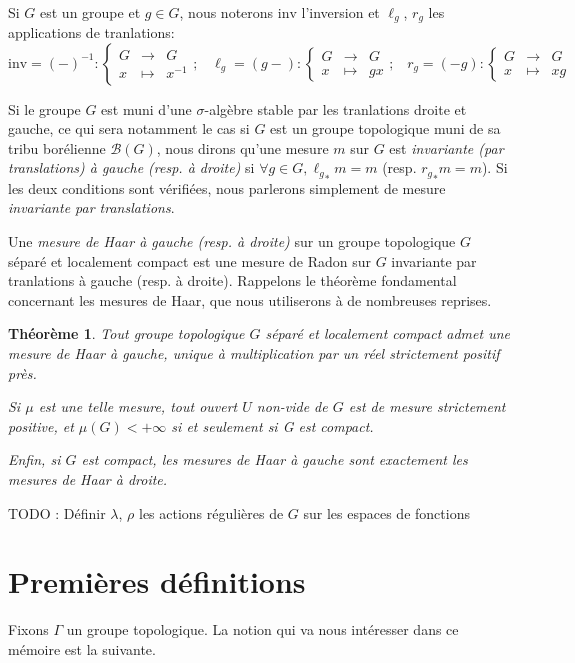 \documentclass[a4paper,12pt]{article}
\newtheorem{theorem}{Théorème}[section]
\newcommand{\Bor}{\mathcal{B}}
\newcommand\fundef[3]{#1: \left\{\begin{array}{ccc}#2\\#3\end{array}\right.}
\newcommand{\ssi}{si et seulement si }
\newcommand{\inv}{^{-1}}
\newcommand{\blank}{{-}}
\newcommand{\invop}{\mathrm{inv}}
\newcommand{\TODO}[1]{{\color{red}TODO :} #1}
\begin{document}
\paragraph{}
Si $G$ est un groupe et $g\in G$, nous noterons $\invop$ l'inversion et $\ell_g$, $r_g$ les applications de tranlations:
\begin{equation*}
    \fundef{\invop = (\blank)\inv}{G&\to& G}{x&\mapsto& x\inv}\text{;}\quad\fundef{\ell_g=(g\blank)}{G&\to& G}{x&\mapsto& gx}\text{;}\quad\fundef{r_g=(\blank g)}{G&\to& G}{x&\mapsto& xg}
\end{equation*}

Si le groupe $G$ est muni d'une $\sigma$-algèbre stable par les tranlations droite et gauche, ce qui sera notamment le cas
si $G$ est un groupe topologique muni de sa tribu borélienne $\Bor(G)$, nous dirons qu'une mesure $m$ sur $G$ est \textit{invariante
(par translations) à gauche (resp. à droite)} si $\forall g\in G, {\ell_g}_*m = m$ (resp. ${r_g}_*m = m$). Si les deux conditions
sont vérifiées, nous parlerons simplement de mesure \textit{invariante par translations}.

Une \textit{mesure de Haar à gauche (resp. à droite)} sur un groupe topologique $G$ séparé et localement compact est une mesure de
Radon sur $G$ invariante par tranlations à gauche (resp. à droite). Rappelons le théorème fondamental concernant les mesures de Haar, que nous 
utiliserons à de nombreuses reprises.

\begin{theorem}\label{theorem_Haar}
    Tout groupe topologique $G$ séparé et localement compact admet une mesure de Haar à gauche, unique à multiplication par un réel strictement 
    positif près. 
    
    Si $\mu$ est une telle mesure, tout ouvert $U$ non-vide de $G$ est de mesure strictement positive,
    et $\mu(G)<+\infty$ \ssi G est compact.

    Enfin, si $G$ est compact, les mesures de Haar à gauche sont exactement les mesures de Haar à droite.
\end{theorem}

\TODO{Définir $\lambda$, $\rho$ les actions régulières de $G$ sur les espaces de fonctions}


\section{Premières définitions}

Fixons $\Gamma$ un groupe topologique. La notion qui va nous intéresser dans ce mémoire est la suivante.
\end{document}
